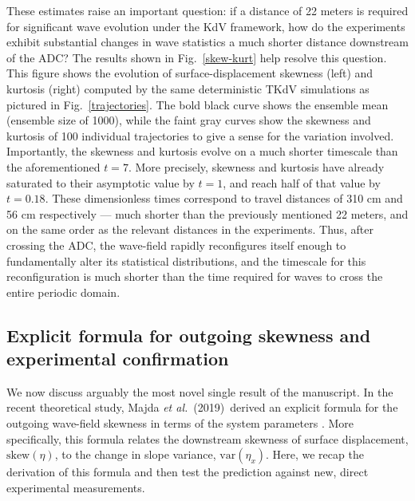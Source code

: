 \documentclass[11pt]{article}
\newcommand{\skw}{\text{skew}}
\newcommand{\var}{\text{var}}
\newcommand{\maetal}{Majda {\it et al.}~(2019)~}
\begin{document}
	These estimates raise an important question: if a distance of 22 meters is required for significant wave evolution under the KdV framework, how do the experiments exhibit substantial changes in wave statistics a much shorter distance downstream of the ADC? The results shown in Fig.~\ref{skew-kurt} help resolve this question. This figure shows the evolution of surface-displacement skewness (left) and kurtosis (right) computed by the same deterministic TKdV simulations as pictured in Fig.~\ref{trajectories}. The bold black curve shows the ensemble mean (ensemble size of 1000), while the faint gray curves show the skewness and kurtosis of 100 individual trajectories to give a sense for the variation involved. Importantly, the skewness and kurtosis evolve on a much shorter timescale than the aforementioned $t=7$. More precisely, skewness and kurtosis have already saturated to their asymptotic value by $t = 1$, and reach half of that value by $t = 0.18$. These dimensionless times correspond to travel distances of 310 cm and 56 cm respectively --- much shorter than the previously mentioned 22 meters, and on the same order as the relevant distances in the experiments. Thus, after crossing the ADC, the wave-field rapidly reconfigures itself enough to fundamentally alter its statistical distributions, and the timescale for this reconfiguration is much shorter than the time required for waves to cross the entire periodic domain.


\subsection{Explicit formula for outgoing skewness and experimental confirmation}

We now discuss arguably the most novel single result of the manuscript. In the recent theoretical study, \maetal derived an explicit formula for the outgoing wave-field skewness in terms of the system parameters \cite{majda2019}. More specifically, this formula relates the downstream skewness of surface displacement, $\skw(\eta)$, to the change in slope variance, $\var(\eta_x)$. Here, we recap the derivation of this formula and then test the prediction against new, direct experimental measurements.
\end{document}
